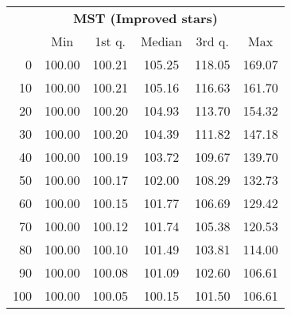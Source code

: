 \begin{tabular}{r|ccccc}
  \multicolumn{6}{c}{{\bf MST (Improved stars)}} \\
  & Min & 1st q. & Median & 3rd q. & Max \\ \hline\hline
  0 & 100.00 & 100.21 & 105.25 & 118.05 & 169.07
\\ 10 & 100.00 & 100.21 & 105.16 & 116.63 & 161.70
\\ 20 & 100.00 & 100.20 & 104.93 & 113.70 & 154.32
\\ 30 & 100.00 & 100.20 & 104.39 & 111.82 & 147.18
\\ 40 & 100.00 & 100.19 & 103.72 & 109.67 & 139.70
\\ 50 & 100.00 & 100.17 & 102.00 & 108.29 & 132.73
\\ 60 & 100.00 & 100.15 & 101.77 & 106.69 & 129.42
\\ 70 & 100.00 & 100.12 & 101.74 & 105.38 & 120.53
\\ 80 & 100.00 & 100.10 & 101.49 & 103.81 & 114.00
\\ 90 & 100.00 & 100.08 & 101.09 & 102.60 & 106.61
\\ 100 & 100.00 & 100.05 & 100.15 & 101.50 & 106.61
\end{tabular}
